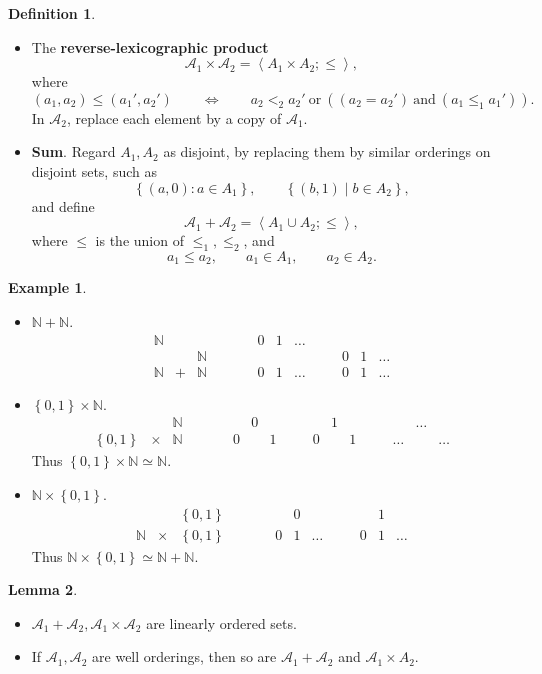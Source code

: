\documentclass{article}
\newcommand{\N}{\mathbb{N}}
\newcommand{\A}{\mathcal{A}}
\newcommand{\rb}[1]{\left( #1 \right)}
\newcommand{\cb}[1]{\left\{ #1 \right\}}
\newcommand{\ab}[1]{\left\langle #1 \right\rangle}
\theoremstyle{definition}\newtheorem{definition}{Definition}[subsection]
\theoremstyle{definition}\newtheorem{remark1}[definition]{Remark}
\theoremstyle{definition}\newtheorem{example1}[definition]{Example}
\theoremstyle{definition}\newtheorem*{remark2}{Remark}
\theoremstyle{definition}\newtheorem*{example2}{Example}
\theoremstyle{definition}\newtheorem*{note}{Note}
\theoremstyle{definition}\newtheorem*{notation}{Notation}
\newtheorem{lemma}[definition]{Lemma}
\begin{document}
\begin{definition}
\hfill
\begin{itemize}
\item The \textbf{reverse-lexicographic product}
$$ \A_1 \times \A_2 = \ab{A_1 \times A_2; \le}, $$
where
$$ \rb{a_1, a_2} \le \rb{a_1', a_2'} \qquad \iff \qquad a_2 <_2 a_2' \ \text{or} \ \rb{\rb{a_2 = a_2'} \ \text{and} \ \rb{a_1 \le_1 a_1'}}. $$
In $ \A_2 $, replace each element by a copy of $ \A_1 $.
\item \textbf{Sum}. Regard $ A_1, A_2 $ as disjoint, by replacing them by similar orderings on disjoint sets, such as
$$ \cb{\rb{a, 0} : a \in A_1}, \qquad \cb{\rb{b, 1} \mid b \in A_2}, $$
and define
$$ \A_1 + \A_2 = \ab{A_1 \cup A_2; \le}, $$
where $ \le $ is the union of $ \le_1, \le_2 $, and
$$ a_1 \le a_2, \qquad a_1 \in A_1, \qquad a_2 \in A_2. $$
\end{itemize}
\end{definition}

\begin{example2}
\hfill
\begin{itemize}
\item $ \N + \N $.
$$
\begin{array}{ccccccccccc}
\N & & & \qquad & 0 & 1 & \dots & \quad & & & \\
& & \N & \qquad & & & & \quad & 0 & 1 & \dots \\
\N & + & \N & \qquad & 0 & 1 & \dots & \quad & 0 & 1 & \dots
\end{array}
$$
\item $ \cb{0, 1} \times \N $.
$$
\begin{array}{ccccccccccccccc}
& & \N & \qquad & & 0 & & \quad & & 1 & & \quad & & \dots & \\
\cb{0, 1} & \times & \N & \qquad & 0 & & 1 & \quad & 0 & & 1 & \quad & \dots & & \dots
\end{array}
$$
Thus $ \cb{0, 1} \times \N \simeq \N $.
\item $ \N \times \cb{0, 1} $.
$$
\begin{array}{ccccccccccc}
& & \cb{0, 1} & \qquad & & 0 & & \quad & & 1 & \\
\N & \times & \cb{0, 1} & \qquad & 0 & 1 & \dots & \quad & 0 & 1 & \dots
\end{array}
$$
Thus $ \N \times \cb{0, 1} \simeq \N + \N $.
\end{itemize}
\end{example2}

\pagebreak

\begin{lemma}
\hfill
\begin{itemize}
\item $ \A_1 + \A_2, \A_1 \times \A_2 $ are linearly ordered sets.
\item If $ \A_1, \A_2 $ are well orderings, then so are $ \A_1 + \A_2 $ and $ \A_1 \times A_2 $.
\end{itemize}
\end{lemma}
\end{document}
